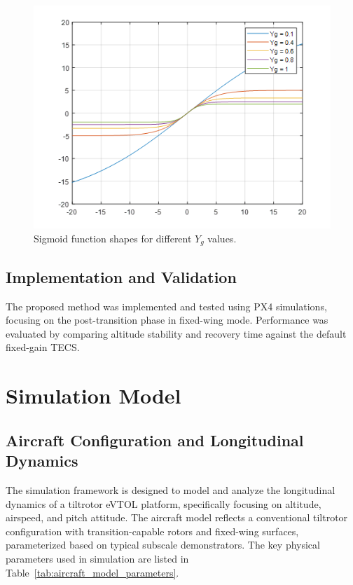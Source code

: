 \documentclass[journal,article,submit,pdftex,moreauthors]{Definitions/mdpi}
\begin{document}
\begin{figure}[H]
    \centering
    \includegraphics[width=0.6\linewidth]{figures/sigmoid_function_shapes.png}
    \caption{Sigmoid function shapes for different $Y_g$ values.}
    \label{fig:sigmoid_function_shapes}
\end{figure}

\subsection{Implementation and Validation}
The proposed method was implemented and tested using PX4 simulations, focusing on the post-transition phase in fixed-wing mode. Performance was evaluated by comparing altitude stability and recovery time against the default fixed-gain TECS.

\section{Simulation Model}
\subsection{Aircraft Configuration and Longitudinal Dynamics}
The simulation framework is designed to model and analyze the longitudinal dynamics of a tiltrotor eVTOL platform, specifically focusing on altitude, airspeed, and pitch attitude. The aircraft model reflects a conventional tiltrotor configuration with transition-capable rotors and fixed-wing surfaces, parameterized based on typical subscale demonstrators. The key physical parameters used in simulation are listed in Table~\ref{tab:aircraft_model_parameters}.
\end{document}
